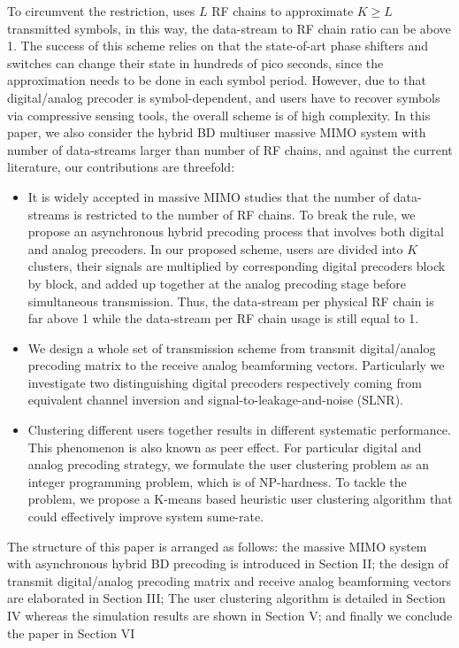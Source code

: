 \documentclass[conference]{IEEEtran}
\begin{document}
To circumvent the restriction, \cite{garcia2017mimo} uses $L$ RF chains to approximate $K\geq L$ transmitted symbols, in this way, the data-stream to RF chain ratio can be above 1. The success of this scheme relies on that the state-of-art phase shifters and switches can change their state in hundreds of pico seconds, since the approximation needs to be done in each symbol period. However, due to that digital/analog precoder is symbol-dependent, and users have to recover symbols via compressive sensing tools, the overall scheme is of high complexity. In this paper, we also consider the hybrid BD multiuser massive MIMO system with number of data-streams larger than number of RF chains, and against the current literature, our contributions are threefold:

\begin{itemize}
	\item It is widely accepted in massive MIMO studies that the number of data-streams is restricted to the number of RF chains. To break the rule, we propose an asynchronous hybrid precoding process that involves both digital and analog precoders. In our proposed scheme, users are divided into $K$ clusters, their signals are multiplied by corresponding digital precoders block by block, and added up together at the analog precoding stage before simultaneous transmission. Thus, the data-stream per physical RF chain is far above 1 while the data-stream per RF chain usage is still equal to 1.
	\item We design a whole set of transmission scheme from transmit digital/analog precoding matrix to the receive analog beamforming vectors. Particularly we investigate two distinguishing digital precoders respectively coming from equivalent channel inversion and signal-to-leakage-and-noise (SLNR).
	\item Clustering different users together results in different systematic performance. This phenomenon is also known as peer effect. For particular digital and analog precoding strategy, we formulate the user clustering problem as an integer programming problem, which is of NP-hardness. To tackle the problem, we propose a K-means based heuristic user clustering algorithm that could effectively improve system sume-rate.
\end{itemize}

The structure of this paper is arranged as follows: the massive MIMO system with asynchronous hybrid BD precoding is introduced in Section II; the design of transmit digital/analog precoding matrix and receive analog beamforming vectors are elaborated in Section III; The user clustering algorithm is detailed in Section IV whereas the simulation results are shown in Section V; and finally we conclude the paper in Section VI
\end{document}
